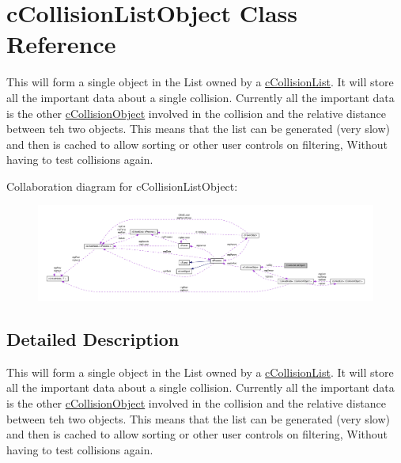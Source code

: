 \hypertarget{classc_collision_list_object}{
\section{cCollisionListObject Class Reference}
\label{classc_collision_list_object}
}


This will form a single object in the List owned by a \hyperlink{classc_collision_list}{cCollisionList}. It will store all the important data about a single collision. Currently all the important data is the other \hyperlink{classc_collision_object}{cCollisionObject} involved in the collision and the relative distance between teh two objects. This means that the list can be generated (very slow) and then is cached to allow sorting or other user controls on filtering, Without having to test collisions again.  




Collaboration diagram for cCollisionListObject:\nopagebreak
\begin{figure}[H]
\begin{center}
\leavevmode
\includegraphics[width=400pt]{classc_collision_list_object__coll__graph}
\end{center}
\end{figure}


\subsection{Detailed Description}
This will form a single object in the List owned by a \hyperlink{classc_collision_list}{cCollisionList}. It will store all the important data about a single collision. Currently all the important data is the other \hyperlink{classc_collision_object}{cCollisionObject} involved in the collision and the relative distance between teh two objects. This means that the list can be generated (very slow) and then is cached to allow sorting or other user controls on filtering, Without having to test collisions again. 